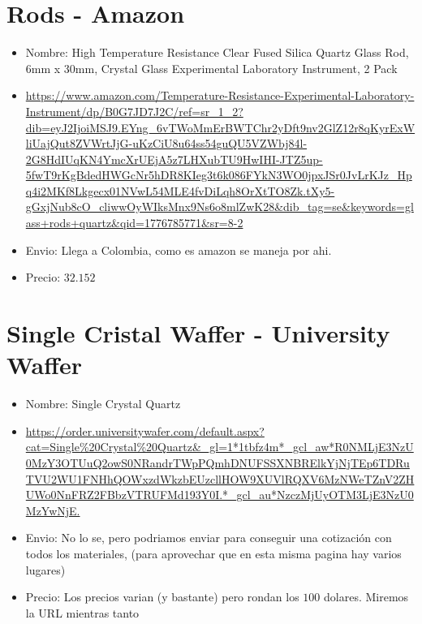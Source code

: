 \documentclass[a4paper]{article}
\begin{document}
\section{Rods - Amazon}
\begin{itemize}
  \item Nombre: High Temperature Resistance Clear Fused Silica Quartz Glass Rod, 6mm x 30mm, Crystal Glass Experimental Laboratory Instrument, 2 Pack 
  \item \url{https://www.amazon.com/Temperature-Resistance-Experimental-Laboratory-Instrument/dp/B0G7JD7J2C/ref=sr_1_2?dib=eyJ2IjoiMSJ9.EYng_6vTWoMmErBWTChr2yDft9nv2GlZ12r8qKyrExWliUajQut8ZVWrtJjG-uKzCiU8u64ss54guQU5VZWbj84l-2G8HdIUqKN4YmcXrUEjA5z7LHXubTU9HwIHI-JTZ5up-5fwT9rKgBdedHWGcNr5hDR8KIeg3t6k086FYkN3WO0jpxJSr0JvLrKJz_Hpq4i2MKf8Lkgecx01NVwL54MLE4fvDiLqh8OrXtTO8Zk.tXy5-gGxjNub8cO_cliwwOyWIksMnx9Ns6o8mlZwK28&dib_tag=se&keywords=glass+rods+quartz&qid=1776785771&sr=8-2}
  \item Envio: Llega a Colombia, como es amazon se maneja por ahi.
  \item Precio: $32.152$
\end{itemize}

\section{Single Cristal Waffer - University Waffer}
\begin{itemize}
  \item Nombre: Single Crystal Quartz
  \item \url{https://order.universitywafer.com/default.aspx?cat=Single\%20Crystal\%20Quartz&_gl=1*1tbfz4m*_gcl_aw*R0NMLjE3NzU0MzY3OTUuQ2owS0NRandrTWpPQmhDNUFSSXNBRElkYjNjTEp6TDRuTVU2WU1FNHhQOWxzdWkzbEUzcllHOW9XUVlRQXV6MzNWeTZnV2ZHUWo0NnFRZ2FBbzVTRUFMd193Y0I.*_gcl_au*NzczMjUyOTM3LjE3NzU0MzYwNjE.}
  \item Envio: No lo se, pero podriamos enviar para conseguir una cotización con todos los materiales, (para aprovechar que en esta misma pagina hay varios lugares)
  \item Precio: Los precios varian (y bastante) pero rondan los $100$ dolares. Miremos la URL mientras tanto
\end{itemize}
\end{document}
